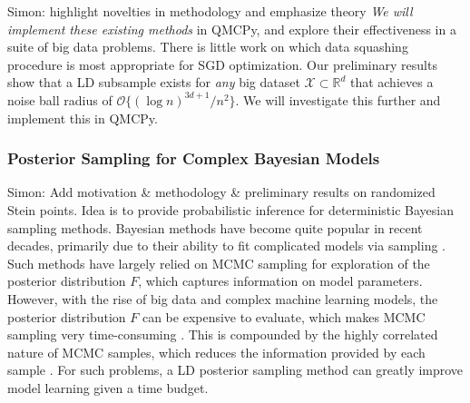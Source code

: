 \documentclass[11pt]{NSFamsart}
\newcommand{\SMNote}[1]{{\color{blue}Simon: #1}}
\begin{document}
\SMNote{highlight novelties in methodology and emphasize theory} \textit{We will implement these existing methods} in QMCPy, and explore their effectiveness in a suite of big data problems. There is little work on which data squashing procedure is most appropriate for SGD optimization. Our preliminary results show that a LD subsample exists for \textit{any} big dataset $\mathcal{X} \subset \mathbb{R}^d$ that achieves a noise ball radius of $\mathcal{O}\{(\log n)^{3d+1}/n^2\}$. We will investigate this further and implement this in QMCPy.

\subsubsection{Posterior Sampling for Complex Bayesian Models}

\SMNote{Add motivation \& methodology \& preliminary results on randomized Stein points. Idea is to provide probabilistic inference for deterministic Bayesian sampling methods.} Bayesian methods have become quite popular in recent decades, primarily due to their ability to fit complicated models via sampling \cite{GelEtal13}. Such methods have largely relied on MCMC sampling for exploration of the posterior distribution $F$, which captures information on model parameters. However, with the rise of big data and complex machine learning models, the posterior distribution $F$ can be expensive to evaluate, which makes MCMC sampling very time-consuming \cite{joseph2015sequential}. This is compounded by the highly correlated nature of MCMC samples, which reduces the information provided by each sample \citep{link2012thinning}. For such problems, a LD posterior sampling method can greatly improve model learning given a time budget.

\end{document}
